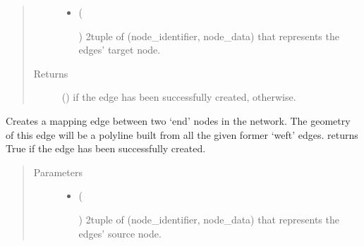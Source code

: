 \documentclass[letterpaper,10pt,english]{sphinxmanual}
\begin{document}
\begin{fulllineitems}
\begin{fulllineitems}
\begin{quote}
\begin{description}
\begin{itemize}
\item {} 
 (%
\begin{footnote}[74]\sphinxAtStartFootnote
{}
%
\end{footnote}) \textendash{} 2\sphinxhyphen{}tuple of (node\_identifier, node\_data) that represents the edges’
target node.

\end{itemize}

\item[{Returns}] \leavevmode
{} () \textendash{}  if the edge has been successfully created,
 otherwise.

\end{description}\end{quote}

\end{fulllineitems}


\begin{fulllineitems}
\label{\detokenize{cockatoo:cockatoo.KnitNetworkBase.create_segment_contour_edge}}
Creates a mapping edge between two ‘end’ nodes in the network. The
geometry of this edge will be a polyline built from all the given
former ‘weft’ edges. returns True if the edge has been successfully
created.
\begin{quote}\begin{description}
\item[{Parameters}] \leavevmode\begin{itemize}
\item {} 
 (%
\begin{footnote}[75]\sphinxAtStartFootnote
{}
%
\end{footnote}) \textendash{} 2\sphinxhyphen{}tuple of (node\_identifier, node\_data) that represents the edges’
source node.


\end{itemize}
\end{description}
\end{quote}
\end{fulllineitems}
\end{fulllineitems}
\end{document}
